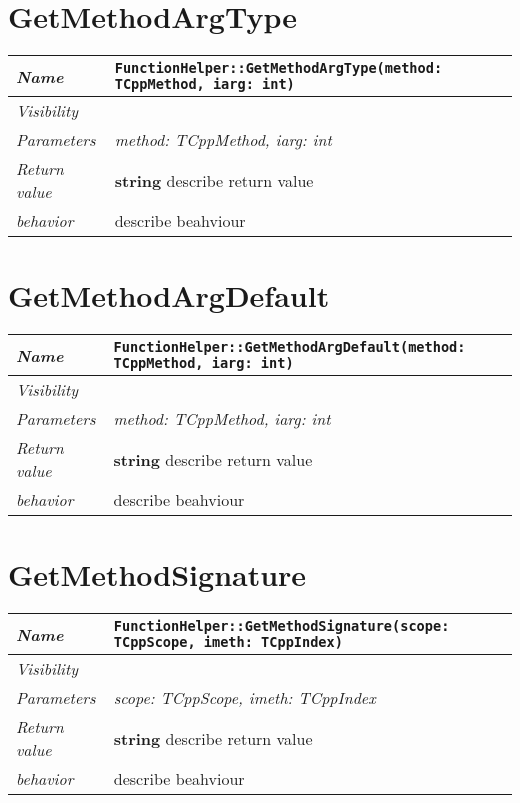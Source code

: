  \section{GetMethodArgType}
\begin{longtable}{p{3cm} @{\hskip 1cm} p{12cm}}
 \hline
\textit{Name} & \texttt{FunctionHelper::GetMethodArgType(method: TCppMethod, iarg: int)}\\
\hline
 \textit{Visibility} & \\
\hline
\textit{Parameters} & \textit{method: TCppMethod, iarg: int}\\
\hline
\textit{Return value} & \textbf{ string} describe return value\\
  \hline
 \textit{behavior} & describe beahviour \\
\hline
\end{longtable} \pagebreak
 \section{GetMethodArgDefault}
\begin{longtable}{p{3cm} @{\hskip 1cm} p{12cm}}
 \hline
\textit{Name} & \texttt{FunctionHelper::GetMethodArgDefault(method: TCppMethod, iarg: int)}\\
\hline
 \textit{Visibility} & \\
\hline
\textit{Parameters} & \textit{method: TCppMethod, iarg: int}\\
\hline
\textit{Return value} & \textbf{ string} describe return value\\
  \hline
 \textit{behavior} & describe beahviour \\
\hline
\end{longtable} \pagebreak
 \section{GetMethodSignature}
\begin{longtable}{p{3cm} @{\hskip 1cm} p{12cm}}
 \hline
\textit{Name} & \texttt{FunctionHelper::GetMethodSignature(scope: TCppScope, imeth: TCppIndex)}\\
\hline
 \textit{Visibility} & \\
\hline
\textit{Parameters} & \textit{scope: TCppScope, imeth: TCppIndex}\\
\hline
\textit{Return value} & \textbf{ string} describe return value\\
  \hline
 \textit{behavior} & describe beahviour \\
\hline
\end{longtable} \pagebreak

